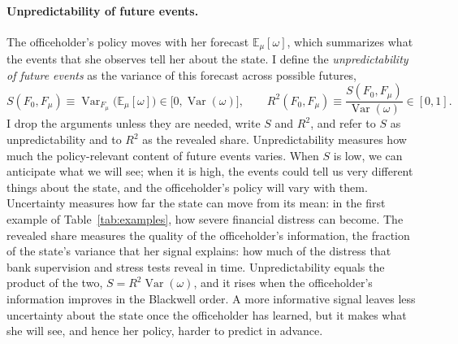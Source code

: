 \documentclass[12pt,letterpaper]{article}
\begin{document}
\paragraph{Unpredictability of future events.}
The officeholder's policy moves with her forecast $\mathbb{E}_\mu[\omega]$, which summarizes what the events that she observes tell her about the state. I define the \emph{unpredictability of future events} as the variance of this forecast across possible futures,
\[
S(F_0,F_\mu)\equiv\operatorname{Var}_{F_\mu}\!\big(\mathbb{E}_\mu[\omega]\big)\in\big[0,\operatorname{Var}(\omega)\big],\qquad R^2(F_0,F_\mu)\equiv\frac{S(F_0,F_\mu)}{\operatorname{Var}(\omega)}\in[0,1].
\]
I drop the arguments unless they are needed, write $S$ and $R^2$, and refer to $S$ as unpredictability and to $R^2$ as the revealed share. Unpredictability measures how much the policy-relevant content of future events varies. When $S$ is low, we can anticipate what we will see; when it is high, the events could tell us very different things about the state, and the officeholder's policy will vary with them. Uncertainty measures how far the state can move from its mean: in the first example of Table~\ref{tab:examples}, how severe financial distress can become. The revealed share measures the quality of the officeholder's information, the fraction of the state's variance that her signal explains: how much of the distress that bank supervision and stress tests reveal in time. Unpredictability equals the product of the two, $S=R^2\operatorname{Var}(\omega)$, and it rises when the officeholder's information improves in the Blackwell order. A more informative signal leaves less uncertainty about the state once the officeholder has learned, but it makes what she will see, and hence her policy, harder to predict in advance.
\end{document}
